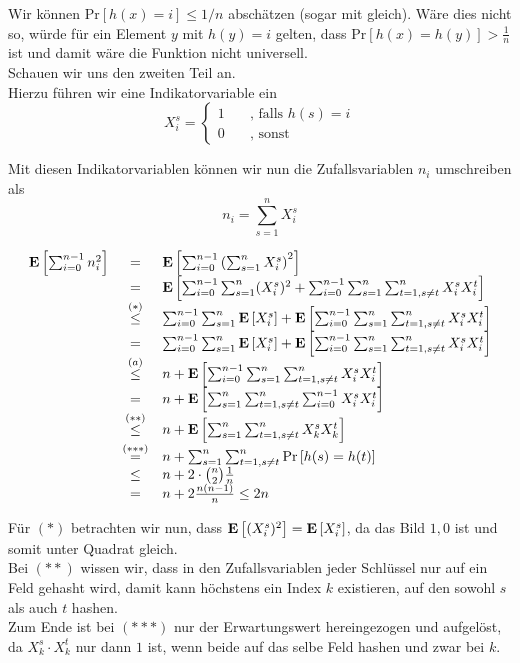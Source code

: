 \documentclass[11pt,a4paper,ngerman]{article}
\newcommand{\erw}[1]{\text{\bfseries E} \left[ #1 \right]}
\newcommand{\prob}[1]{\text{Pr}\left[ #1 \right]}
\begin{document}
Wir können $\prob{h(x)=i} \leq 1 / n$ abschätzen (sogar mit gleich). Wäre dies nicht so, würde für ein Element $y$ mit $h(y) = i$ gelten, dass
$\prob{h(x) = h(y)} > \frac{1}{n}$ ist und damit wäre die Funktion nicht universell.\\

Schauen wir uns den zweiten Teil an.\\

Hierzu führen wir eine Indikatorvariable ein
$$
	X_i^s = \left\{ \begin{array}{lr} 1 \quad&\text{, falls }h(s) = i\\ 0 &\text{, sonst} \end{array} \right.
$$

Mit diesen Indikatorvariablen können wir nun die Zufallsvariablen $n_i$ umschreiben als
$$
	n_i = \sum_{s=1}^{n} X_i^s
$$

$$\begin{array}{rcl}
	\erw{\sum_{i=0}^{n-1} n_i^2} 
				&=& \erw{\sum_{i=0}^{n-1}\left(\sum_{s=1}^n X_i^s\right)^2}\\
				&=&\erw{ \sum_{i=0}^{n-1} \sum_{s=1}^n (X_i^s)^2 + \sum_{i=0}^{n-1}\sum_{s=1}^n \sum_{t=1, s\not=t}^n X_i^s X_i^t}\\
				&\stackrel{(*)}{\leq}& 
				\sum_{i=0}^{n-1} \sum_{s=1}^n \erw{X_i^s} + \erw{\sum_{i=0}^{n-1}\sum_{s=1}^n \sum_{t=1, s\not=t}^n X_i^s X_i^t} \\
				&=& \sum_{i=0}^{n-1}\sum_{s=1}^n \erw{X_i^s} + \erw{\sum_{i=0}^{n-1}\sum_{s=1}^n \sum_{t=1, s\not=t}^n X_i^s X_i^t} \\
				&\stackrel{(a)}{\leq}& n +\erw{\sum_{i=0}^{n-1}\sum_{s=1}^n \sum_{t=1, s\not=t}^n X_i^s X_i^t} \\
				&=& n + \erw{ \sum_{s=1}^n \sum_{t=1, s\not=t}^n\sum_{i=0}^{n-1} X_i^s X_i^t}\\
				&\stackrel{(**)}{\leq}& n + \erw{\sum_{s=1}^n \sum_{t=1, s\not=t}^n  X_k^s X_k^t} \\
				&\stackrel{(***)}{=}& n + \sum_{s=1}^n \sum_{t=1,s\not=t}^n \prob{h(s)=h(t)}\\
				&\leq& n + 2\cdot \binom{n}{2} \frac{1}{n}\\
				&=& n + 2 \frac{n(n-1)}{n} \leq 2n
				
\end{array}$$

Für $(*)$ betrachten wir nun, dass $\erw{(X_i^s)^2} = \erw{X_i^s}$, da das Bild $1,0$ ist und somit unter Quadrat gleich.\\
Bei $(**)$ wissen wir, dass in den Zufallsvariablen jeder Schlüssel nur auf ein Feld gehasht wird, damit kann höchstens ein Index $k$ existieren,
auf den sowohl $s$ als auch $t$ hashen.\\
Zum Ende ist bei $(***)$ nur der Erwartungswert hereingezogen und aufgelöst, da $X_k^s \cdot X_k^t$ nur dann $1$ ist, wenn beide auf das selbe Feld hashen und zwar bei $k$.
\end{document}
